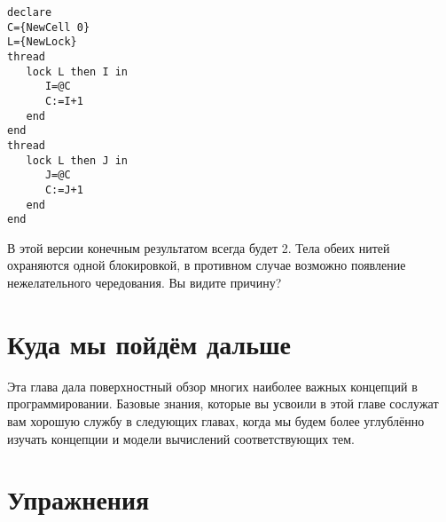 \begin{lstlisting}
declare
C={NewCell 0}
L={NewLock}
thread
   lock L then I in
      I=@C
      C:=I+1
   end
end
thread
   lock L then J in
      J=@C
      C:=J+1
   end
end
\end{lstlisting}

В этой версии конечным результатом всегда будет 2. Тела обеих нитей охраняются одной блокировкой, в противном случае возможно появление нежелательного чередования. Вы видите причину?

\section{Куда мы пойдём дальше}

Эта глава дала поверхностный обзор многих наиболее важных концепций в программировании. Базовые знания, которые вы усвоили в этой главе сослужат вам хорошую службу в следующих главах, когда мы будем более углублённо изучать концепции и модели вычислений соответствующих тем.

\section{Упражнения}

